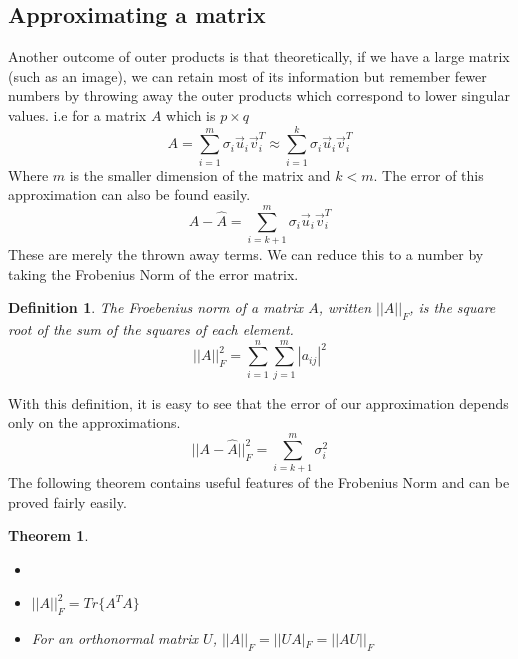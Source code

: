 \documentclass{article}
\newtheorem{theorem}{Theorem}
\newtheorem{definition}{Definition}
\begin{document}
\subsection{Approximating a matrix}
Another outcome of outer products is that theoretically, if we have a large matrix (such as an image),
we can retain most of its information but remember fewer numbers by throwing away the outer products which correspond to lower singular values.
i.e for a matrix $A$ which is $p \times q$
$$A = \sum_{i=1}^{m}{\sigma_i\vec{u}_i\vec{v}_i^T} \approx \sum_{i=1}^{k}{\sigma_i\vec{u}_i\vec{v}_i^T}$$
Where $m$ is the smaller dimension of the matrix and $k < m$. The error of this approximation can also be found easily.
$$A - \hat{A} = \sum_{i=k+1}^{m}{\sigma_i\vec{u}_i\vec{v}_i^T}$$
These are merely the thrown away terms. We can reduce this to a number by taking the Frobenius Norm of the error matrix.
\begin{definition}
    The Froebenius norm of a matrix $A$, written $||A||_F$, is the square root of the sum of the squares of each element.
    $$||A||_F^2 = \sum_{i=1}^{n}{\sum_{j=1}^{m}{|a_{ij}|^2}}$$
\end{definition}
With this definition, it is easy to see that the error of our approximation depends only on the approximations.
$$||A-\hat{A}||_F^2 = \sum_{i=k+1}^{m}{\sigma_i^2}$$
The following theorem contains useful features of the Frobenius Norm and can be proved fairly easily.
\begin{theorem}
    \begin{itemize}
        \item[]
        \item[1. ] $||A||_F^2=Tr\{A^TA\}$
        \item[2. ] For an orthonormal matrix $U$, $||A||_F=||UA|_F=||AU||_F$
    \end{itemize}
\end{theorem}
\end{document}
